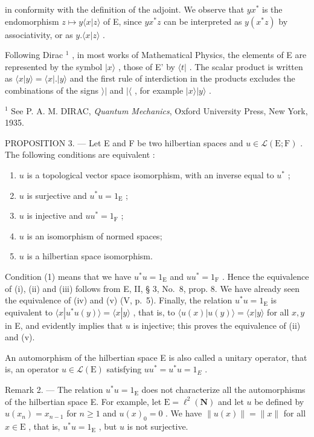 in conformity with the definition of the adjoint. We observe that \(yx^{*}\) is the endomorphism \(z \mapsto y\langle x|z\rangle\) of E, since \(yx^{*}z\) can be interpreted as \(y(x^{*}z)\) by associativity, or as \(y.\langle x|z\rangle\) .

Following Dirac \(^{1}\) , in most works of Mathematical Physics, the elements of E are represented by the symbol \(|x\rangle\) , those of E' by \(\langle t|\) . The scalar product is written as \(\langle x|y\rangle = \langle x|.|y\rangle\) and the first rule of interdiction in the products excludes the combinations of the signs \(\rangle|\) and \(|\langle\) , for example \(|x\rangle|y\rangle\) .

\(^{1}\) See P. A. M. DIRAC, \emph{Quantum Mechanics}, Oxford University Press, New York, 1935.

PROPOSITION 3. --- Let E and F be two hilbertian spaces and \(u \in \mathcal{L}(\mathrm{E};\mathrm{F})\) . The following conditions are equivalent :

\begin{enumerate}
\def\labelenumi{(\roman{enumi})}
\item
  \(u\) is a topological vector space isomorphism, with an inverse equal to \(u^{*}\) ;
\item
  \(u\) is surjective and \(u^{*}u = 1_{\mathrm{E}}\) ;
\item
  \(u\) is injective and \(uu^{*} = 1_{\mathrm{F}}\) ;
\item
  \(u\) is an isomorphism of normed spaces;
\item
  \(u\) is a hilbertian space isomorphism.
\end{enumerate}

Condition (1) means that we have \(u^{*}u = 1_{\mathrm{E}}\) and \(uu^{*} = 1_{\mathrm{F}}\) . Hence the equivalence of (i), (ii) and (iii) follows from E, II, § 3, No.~8, prop. 8. We have already seen the equivalence of (iv) and (v) (V, p.~5). Finally, the relation \(u^{*}u = 1_{\mathrm{E}}\) is equivalent to \(\langle x|u^{*}u(y)\rangle = \langle x|y\rangle\) , that is, to \(\langle u(x)|u(y)\rangle = \langle x|y\rangle\) for all \(x,y\) in E, and evidently implies that \(u\) is injective; this proves the equivalence of (ii) and (v).

An automorphism of the hilbertian space E is also called a unitary operator, that is, an operator \(u \in \mathcal{L}(\mathrm{E})\) satisfying \(uu^{*} = u^{*}u = 1_{E}\) .

Remark 2. --- The relation \(u^{*}u = 1_{\mathrm{E}}\) does not characterize all the automorphisms of the hilbertian space E. For example, let \(\mathrm{E} = \ell^2 (\mathbf{N})\) and let \(u\) be defined by \(u(x_{n}) = x_{n - 1}\) for \(n\geqslant 1\) and \(u(x)_0 = 0\) . We have \(\| u(x)\| = \| x\|\) for all \(x\in \mathrm{E}\) , that is, \(u^{*}u = 1_{\mathrm{E}}\) , but \(u\) is not surjective.


